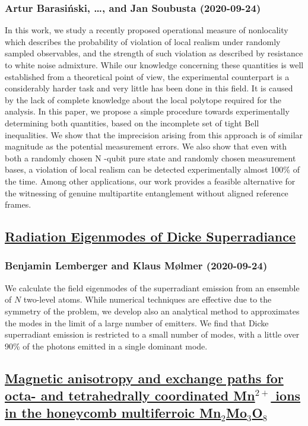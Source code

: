 \subsubsection*{Artur Barasiński, \dots, and Jan Soubusta (2020-09-24)}
In this work, we study a recently proposed operational measure of nonlocality
which describes the probability of violation of local realism under randomly
sampled observables, and the strength of such violation as described by
resistance to white noise admixture. While our knowledge concerning these
quantities is well established from a theoretical point of view, the
experimental counterpart is a considerably harder task and very little has been
done in this field. It is caused by the lack of complete knowledge about the
local polytope required for the analysis. In this paper, we propose a simple
procedure towards experimentally determining both quantities, based on the
incomplete set of tight Bell inequalities. We show that the imprecision arising
from this approach is of similar magnitude as the potential measurement errors.
We also show that even with both a randomly chosen N -qubit pure state and
randomly chosen measurement bases, a violation of local realism can be detected
experimentally almost 100\% of the time. Among other applications, our work
provides a feasible alternative for the witnessing of genuine multipartite
entanglement without aligned reference frames.

\subsection*{\href{http://arxiv.org/abs/2009.11687v1}{Radiation Eigenmodes of Dicke Superradiance}}
\subsubsection*{Benjamin Lemberger and Klaus Mølmer (2020-09-24)}
We calculate the field eigenmodes of the superradiant emission from an
ensemble of $N$ two-level atoms. While numerical techniques are effective due
to the symmetry of the problem, we develop also an analytical method to
approximates the modes in the limit of a large number of emitters. We find that
Dicke superradiant emission is restricted to a small number of modes, with a
little over 90\% of the photons emitted in a single dominant mode.

\subsection*{\href{http://arxiv.org/abs/2009.11683v1}{Magnetic anisotropy and exchange paths for octa- and tetrahedrally  coordinated Mn$^{2+}$ ions in the honeycomb multiferroic Mn$_2$Mo$_3$O$_8$}}
